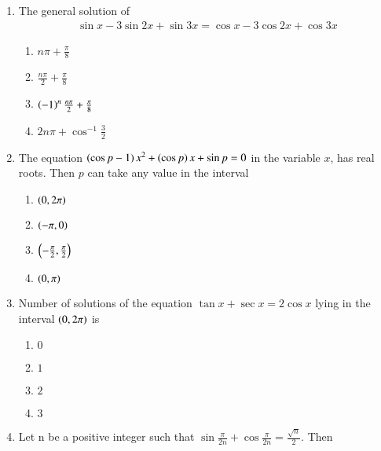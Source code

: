 \begin{enumerate}[label=\thesubsection.\arabic*,ref=\thesubsection.\theenumi]
    \item The general solution of 
	\begin{multline*}
		    \sin{x}-3\sin{2x} + \sin{3x} = \cos{x}-3\cos{2x} + \cos{3x}
	\end{multline*}
        
        \hfill{}
        \begin{enumerate}
                \item $n\pi+\frac{\pi}{8}$
                \item $\frac{n\pi}{2}+\frac{\pi}{8}$
                \item $\left(-1\right)^n\frac{n\pi}{2}+\frac{\pi}{8}$
                \item $2n\pi+\cos^{-1}{\frac{3}{2}}$
        \end{enumerate}


    \item The equation $\left(\cos{p}-1\right)x^2+\left(\cos{p}\right)x+\sin{p}=0$ in the variable $x$, has real roots. Then $p$ can take any value in the interval
        
        \hfill{}
        \begin{enumerate}
                \item $\left(0,2\pi\right)$
                \item $\left(-\pi,0\right)$
                \item $\left(-\frac{\pi}{2},\frac{\pi}{2}\right)$  
                \item $\left(0,\pi\right)$
        \end{enumerate}

    \item Number of solutions of the equation $\tan{x}+\sec{x} = 2\cos{x}$ lying in the interval $\left(0, 2\pi\right)$ is
        
        \hfill{}
        \begin{enumerate}
                \item $0$
                \item $1$
                \item $2$
                \item $3$
        \end{enumerate}


    \item Let n be a positive integer such that $\sin{\frac{\pi}{2n}} + \cos{\frac{\pi}{2n}} = \frac{\sqrt{n}}{2}$. Then
        

\end{enumerate}
